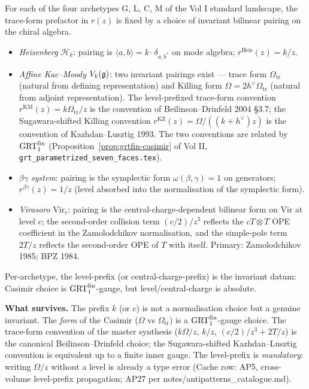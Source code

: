 \begin{proposition}
\ClaimStatusTheorem
\label{prop:trace-form-choice}
For each of the four archetypes G, L, C, M of the Vol I standard
landscape, the trace-form prefactor in $r(z)$ is fixed by a choice of
invariant bilinear pairing on the chiral algebra.
\begin{itemize}
\item[\textsf{G}] \emph{Heisenberg} $\mathcal{H}_k$: pairing is
$\langle a, b \rangle = k \cdot \delta_{a, b^*}$ on mode algebra;
$r^{\mathrm{Heis}}(z) = k/z$.

\item[\textsf{L}] \emph{Affine Kac--Moody} $V_k(\mathfrak{g})$: two invariant
pairings exist --- trace form $\Omega_{\mathrm{tr}}$ (natural from
defining representation) and Killing form $\Omega = 2h^\vee
\Omega_{\mathrm{tr}}$ (natural from adjoint representation). The
level-prefixed trace-form convention $r^{\mathrm{KM}}(z) = k\Omega_{\mathrm{tr}}/z$
is the convention of Beilinson--Drinfeld 2004 \S3.7; the
Sugawara-shifted Killing convention $r^{\mathrm{KZ}}(z) = \Omega/((k+h^\vee)z)$
is the convention of Kazhdan--Lusztig 1993. The two conventions are
related by $\mathrm{GRT}_1^{\mathrm{fin}}$ (Proposition~\ref{prop:grtfin-casimir}
of Vol II, \texttt{grt\_parametrized\_seven\_faces.tex}).

\item[\textsf{C}] \emph{$\beta\gamma$ system}: pairing is the
symplectic form $\omega(\beta, \gamma) = 1$ on generators;
$r^{\beta\gamma}(z) = 1/z$ (level absorbed into the normalisation of
the symplectic form).

\item[\textsf{M}] \emph{Virasoro} $\mathrm{Vir}_c$: pairing is the
central-charge-dependent bilinear form on $\mathrm{Vir}$ at level $c$;
the second-order collision term $(c/2)/z^3$ reflects the $c T \otimes T$
OPE coefficient in the Zamolodchikov normalisation, and the simple-pole
term $2T/z$ reflects the second-order OPE of $T$ with itself.
Primary: Zamolodchikov 1985; BPZ 1984.
\end{itemize}
Per-archetype, the level-prefix (or central-charge-prefix) is the
invariant datum: Casimir choice is $\mathrm{GRT}_1^{\mathrm{fin}}$-gauge,
but level/central-charge is absolute.
\end{proposition}

\textbf{What survives.} The prefix $k$ (or $c$) is not a normalisation
choice but a genuine invariant. The \emph{form} of the Casimir
($\Omega$ vs $\Omega_{\mathrm{tr}}$) is a $\mathrm{GRT}_1^{\mathrm{fin}}$-gauge
choice. The trace-form convention of the master synthesis
($k\Omega/z$, $k/z$, $(c/2)/z^3 + 2T/z$) is the canonical
Beilinson--Drinfeld choice; the Sugawara-shifted Kazhdan--Lusztig
convention is equivalent up to a finite inner gauge. The level-prefix
is \emph{mandatory}: writing $\Omega/z$ without a level is already a
type error (Cache row: AP5, cross-volume level-prefix propagation; AP27
per notes/antipatterns\_catalogue.md).

